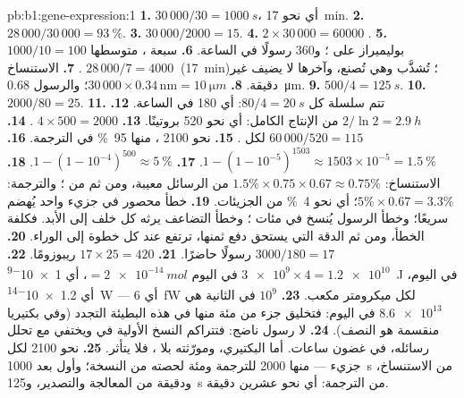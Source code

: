 \begin{solution}{pb:b1:gene-expression:1}
\textbf{1.} $30\,000/30 = \qty{1000}{s}$، أي نحو \qty{17}{min}.
\textbf{2.} $28\,000/30\,000 = \qty{93}{\%}$.
\textbf{3.} $30\,000/2000 = 15$.
\textbf{4.} $2\times 30\,000 = \num{60000}$ .
\textbf{5.} $1000/10 = 100$ بوليميراز على ؛ و360 رسولًا
في الساعة.
\textbf{6.} سبعة ، متوسطها $28\,000/7 = \qty{4000}{}$ .
\textbf{7.} الاستنساخ (\qty{17}{min})؛  تُشذَّب وهي تُصنع،
وآخرها لا يضيف غير دقيقة.
\textbf{8.}  $30\,000\times 0.34\,\mathrm{nm} = \qty{10}{\micro m}$؛ والرسول \qty{0.68}{\micro m}.
\textbf{9.} $500/4 = \qty{125}{s}$.
\textbf{10.} $2000/80 = 25$.
\textbf{11.} تتم سلسلة كل $80/4 = \qty{20}{s}$: أي 180 في
الساعة.
\textbf{12.} $2/\ln 2 = \qty{2.9}{h}$ من الإنتاج الكامل: أي نحو 520
بروتينًا.
\textbf{13.} $4\times 500 = 2000$ .
\textbf{14.} $60\,000/520 = 115$  لكل .
\textbf{15.} نحو 2100 ، منها \qty{95}{\%} في الترجمة.
\textbf{16.} $1 - (1 - 10^{-5})^{1503} \approx 1503\times 10^{-5} =
\qty{1.5}{\%}$.
\textbf{17.} $1 - (1 - 10^{-4})^{500} \approx \qty{5}{\%}$.
\textbf{18.} الاستنساخ: $1.5\%\times 0.75\times 0.67 \approx
0.75\%$ من الرسائل معيبة، ومن ثم من ؛ والترجمة:
$5\%\times 0.67 = 3.3\%$؛ أي نحو \qty{4}{\%} من الجزيئات.
\textbf{19.} خطأ  محصور في جزيء واحد يُهضم سريعًا؛ وخطأ
الرسول يُنسخ في مئات ؛ وخطأ التضاعف يرثه كل خلف إلى
الأبد. فكلفة الخطأ، ومن ثم الدقة التي يستحق دفع ثمنها، ترتفع عند
كل خطوة إلى الوراء.
\textbf{20.} $3000/180 = 17$ رسولًا حاضرًا.
\textbf{21.} $17\times 25 = 420$ ريبوزومًا.
\textbf{22.} $\num{3e9}\times 4 = \num{1.2e10}$  في اليوم
$= \qty{2e-14}{mol}$، أي \qty{1e-9}{J} في اليوم، أي \qty{1.2e-14}{W}
--- أي \qty{6}{fW} لكل ميكرومتر مكعب.
\textbf{23.} $10^9$  في الثانية هي $\num{8.6e13}$ في اليوم:
فتخليق  جزء من مئة منها في هذه  البطيئة التجدد (وفي
بكتيريا منقسمة هو النصف).
\textbf{24.} لا رسول ناضج: فتتراكم النسخ الأولية في  ويختفي
 مع تحلل رسائله، في غضون ساعات. أما  البكتيري،
ومورّثته بلا ، فلا يتأثر.
\textbf{25.} نحو 2100  لكل جزيء --- منها 2000 للترجمة ومئة
لحصته من النسخة؛ وأول  بعد \qty{1000}{s} من الاستنساخ،
ودقيقة من المعالجة والتصدير، و\qty{125}{s} من الترجمة: أي نحو
عشرين دقيقة.
\end{solution}

